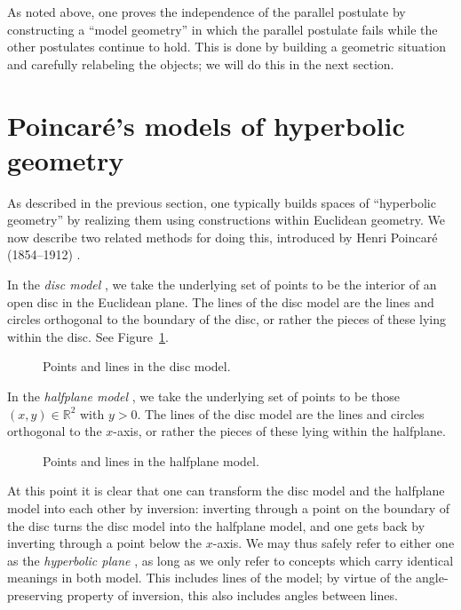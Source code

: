 \documentclass[12pt]{book}
\numberwithin{exc}{section}
\numberwithin{figure}{section}
\numberwithin{equation}{theorem}
\newcommand{\RR}{\mathbb{R}}
\begin{document}
As noted above, one proves the independence of the parallel postulate
by constructing a ``model geometry'' in which the parallel postulate
fails while the other postulates continue to hold. This is done by
building a geometric situation and carefully relabeling the objects; 
we will do this in the next section.

\section{Poincar\'e's models of hyperbolic geometry}

As described in the previous section, one typically builds spaces of
``hyperbolic geometry'' by realizing them using constructions within
Euclidean geometry.
We now describe two related methods for doing this, introduced by
Henri Poincar\'e (1854--1912) .

In the \emph{disc model}
, we take the underlying
set of points to be the interior of an open disc in the Euclidean plane. 
The lines of the disc model are the lines
and circles orthogonal to the boundary of the disc, or rather the pieces of 
these lying within the disc. See Figure~\ref{fig:disc model}.

\begin{figure}[ht] 
\caption{Points and lines in the disc model.}
\label{fig:disc model}
\end{figure}

In the \emph{halfplane model}
, we take the 
underlying set of points to be those $(x,y)\in \RR^2$ with $y>0$.
The lines of the disc model are the lines and circles orthogonal to the
$x$-axis, or rather the pieces of these lying within the halfplane.
\begin{figure}[ht] 
\caption{Points and lines in the halfplane model.}
\label{fig:halfplane model}
\end{figure}

At this point it is clear that one can transform the disc model and the
halfplane model into each other by inversion: inverting through a point
on the boundary of the disc turns the disc model into the halfplane model,
and one gets back by inverting through a point below the $x$-axis. We may
thus safely refer to either one as the \emph{hyperbolic plane}
 , as
long as we only refer to concepts which carry identical meanings in both
model. This includes lines of the model; 
by virtue of the angle-preserving property of inversion, this also
includes angles between lines.
\end{document}

